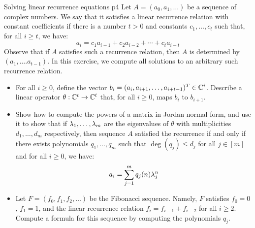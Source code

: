 \documentclass[a4paper, 11pt]{article}
\begin{document}
\begin{problem}{%
		Solving linear recurrence equations
	}{p4%
	}
Let $A=(a_0,a_1,\dots)$ be a sequence of complex numbers. We say that it satisfies a linear recurrence relation with constant coefficients if there is a number $t>0$ and constants $c_1,\dots, c_t$ such that, for all $i\geq t$, we have: $$a_i=c_1a_{i-1}+c_2a_{i-2}+\cdots+c_ta_{i-t}$$Observe that if $A$ satisfies such a recurrence relation, then $A$ is determined by $(a_1,\dots. a_{t-1})$. In this exercise, we compute all solutions to an arbitrary such recurrence relation.
\begin{itemize}[label=$\bullet$]
	\item For all $i\geq 0$, define the vector $b_i=(a_i,a_{i+1},\dots, a_{i+t-1})^T\in \mathbb{C}^i$. Describe a linear operator $\theta:\mathbb{C}^t\to \mathbb{C}^t$ that, for all $i\geq 0$, maps $b_i$ to $b_{i+1}$.
	\item Show how to compute the powers of a matrix in Jordan normal form, and use it to show that if $\lambda_1,\dots, \lambda_m$ are the eigenvalues of $\theta$ with multiplicities $d_1,\dots, d_m$ respectively, then sequence $A$ satisfied the recurrence if and only if there exists polynomials $q_1,\dots, q_m$ such that $\deg (q_j)\leq d_j$ for all $j\in[m]$ and for all $i\geq 0$, we have: $$a_i=\sum_{j=1}^mq_j(n)\lambda_j^n$$
	\item Let $F=(f_0,f_1,f_2,\dots)$ be the Fibonacci sequence. Namely, $F$ satisfies $f_0=0$, $f_1=1$, and the linear recurrence relation $f_i=f_{i-1}+f_{i-2}$ for all $i\geq 2$. Compute a formula for this sequence by computing the polynomials $q_j$.
\end{itemize}
\end{problem}
\end{document}

